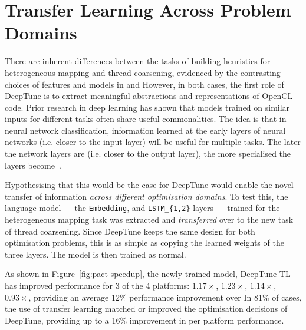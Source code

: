 \section{Transfer Learning Across Problem Domains}
\label{sec:deeptune-transfer-learning}

There are inherent differences between the tasks of building heuristics for heterogeneous mapping and thread coarsening, evidenced by the contrasting choices of features and models in \citeauthor{Grewe2013} and \citeauthor{Magni2014} However, in both cases, the first role of DeepTune is to extract meaningful abstractions and representations of OpenCL code. Prior research in deep learning has shown that models trained on similar inputs for different tasks often share useful commonalities. The idea is that in neural network classification, information learned at the early layers of neural networks (i.e. closer to the input layer) will be useful for multiple tasks. The later the network layers are (i.e. closer to the output layer), the more specialised the layers become~\cite{Zeiler2014}.

Hypothesising that this would be the case for DeepTune would enable the novel transfer of information \emph{across different optimisation domains}. To test this, the language model --- the \texttt{Embedding}, and \texttt{LSTM\_\{1,2\}} layers --- trained for the heterogeneous mapping task was extracted and \emph{transferred} over to the new task of thread coarsening. Since DeepTune keeps the same design for both optimisation problems, this is as simple as copying the learned weights of the three layers. The model is then trained as normal.

As shown in Figure~\ref{fig:pact-speedup}, the newly trained model, DeepTune-TL has improved performance for 3 of the 4 platforms: $1.17\times$, $1.23\times$, $1.14\times$, $0.93\times$, providing an average 12\% performance improvement over \citeauthor{Magni2014}  In 81\% of cases, the use of transfer learning matched or improved the optimisation decisions of DeepTune, providing up to a 16\% improvement in per platform performance.

